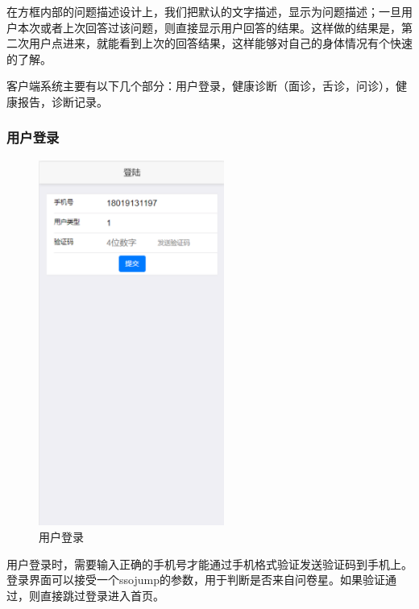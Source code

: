 在方框内部的问题描述设计上，我们把默认的文字描述，显示为问题描述；一旦用户本次或者上次回答过该问题，则直接显示用户回答的结果。这样做的结果是，第二次用户点进来，就能看到上次的回答结果，这样能够对自己的身体情况有个快速的了解。

客户端系统主要有以下几个部分：用户登录，健康诊断（面诊，舌诊，问诊），健康报告，诊断记录。

\subsubsection{用户登录}
\begin{figure}[ht]
    \centering
    \includegraphics[height=12cm]{images/login.png}
    \caption{用户登录}
    \label{fig:login}
\end{figure} 
用户登录时，需要输入正确的手机号才能通过手机格式验证发送验证码到手机上。登录界面可以接受一个ssojump的参数，用于判断是否来自问卷星。如果验证通过，则直接跳过登录进入首页。
 

